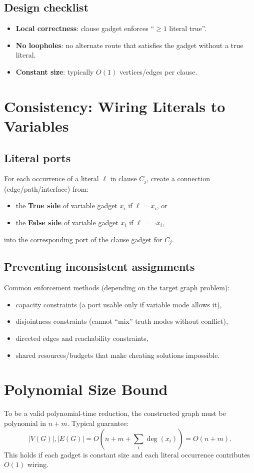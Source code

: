 \documentclass[11pt]{article}
\begin{document}
\subsection{Design checklist}
\begin{itemize}[itemsep=2pt]
  \item \textbf{Local correctness}: clause gadget enforces ``$\ge 1$ literal true''.
  \item \textbf{No loopholes}: no alternate route that satisfies the gadget without a true literal.
  \item \textbf{Constant size}: typically $O(1)$ vertices/edges per clause.
\end{itemize}

\section{Consistency: Wiring Literals to Variables}
\subsection{Literal ports}
For each occurrence of a literal $\ell$ in clause $C_j$, create a connection (edge/path/interface) from:
\begin{itemize}[itemsep=2pt]
  \item the \textbf{True side} of variable gadget $x_i$ if $\ell=x_i$, or
  \item the \textbf{False side} of variable gadget $x_i$ if $\ell=\neg x_i$,
\end{itemize}
into the corresponding port of the clause gadget for $C_j$.

\subsection{Preventing inconsistent assignments}
Common enforcement methods (depending on the target graph problem):
\begin{itemize}[itemsep=2pt]
  \item capacity constraints (a port usable only if variable mode allows it),
  \item disjointness constraints (cannot ``mix'' truth modes without conflict),
  \item directed edges and reachability constraints,
  \item shared resources/budgets that make cheating solutions impossible.
\end{itemize}

\section{Polynomial Size Bound}
To be a valid polynomial-time reduction, the constructed graph must be polynomial in $n+m$.
Typical guarantee:
\[
|V(G)|, |E(G)| = O\!\left(n + m + \sum_i \deg(x_i)\right) = O(n+m).
\]
This holds if each gadget is constant size and each literal occurrence contributes $O(1)$ wiring.
\end{document}
